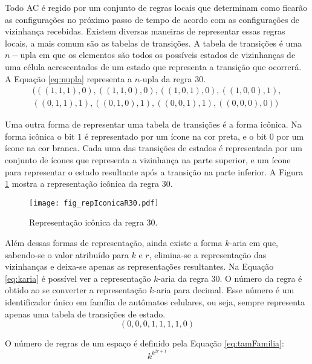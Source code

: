 Todo AC é regido por um conjunto de regras locais que determinam como ficarão as configurações no próximo passo de tempo de acordo com as configurações de vizinhança recebidas. Existem diversas maneiras de representar essas regras locais, a mais comum são as tabelas de transições. A tabela de transições é uma $n-$upla em que os elementos são todos os possíveis estados de vizinhanças de uma célula acrescentados de um estado que representa a transição que ocorrerá. A Equação \ref{eq:nupla} representa a $n$-upla da regra 30.
	\begin{equation}
	\begin{split}
	(((1,1,1),0),((1,1,0),0),((1,0,1),0),((1,0,0),1),\\
	((0,1,1),1),((0,1,0),1),((0,0,1),1),((0,0,0),0))
	\label{eq:nupla}
	\end{split}
	\end{equation}

Uma outra forma de representar uma tabela de transições é a forma icônica. Na forma icônica o bit $1$ é representado por um ícone na cor preta, e o bit $0$ por um ícone na cor branca. Cada uma das transições de estados é representada por um conjunto de ícones que representa a vizinhança na parte superior, e um ícone para representar o estado resultante após a transição na parte inferior. A Figura \ref{fig:repIconicaR30} mostra a representação icônica da regra 30.

	\begin{figure}[h!]
	  \centering
	  \texttt{[image: fig\_repIconicaR30.pdf]}
	  \caption{Representação icônica da regra 30.}
	  \label{fig:repIconicaR30}
	\end{figure}

Além dessas formas de representação, ainda existe a forma $k$-aria em que, sabendo-se o valor atribuído para $k$ e $r$, elimina-se a representação das vizinhanças e deixa-se apenas as representações resultantes. Na Equação \ref{eq:karia} é possível ver a representação $k$-aria da regra 30. O número da regra é obtido ao se converter a representação $k$-aria para decimal. Esse número é um identificador único em família de autômatos celulares, ou seja, sempre representa apenas uma tabela de transições de estado.
	\begin{equation}
	(0,0,0,1,1,1,1,0)
	\label{eq:karia}
	\end{equation}

O número de regras de um espaço é definido pela Equação \ref{eq:tamFamilia}:
	\begin{equation}
	k^{k^{2r+1}}
	\label{eq:tamFamilia}
	\end{equation}

